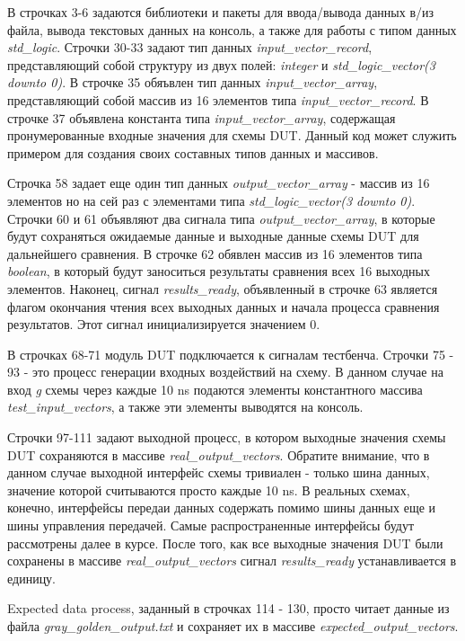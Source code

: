 В строчках 3-6 задаются библиотеки и пакеты для ввода/вывода данных в/из файла, вывода текстовых данных на консоль, а также для работы с типом данных \emph{std\_logic}. Строчки 30-33 задают  тип данных \emph{input\_vector\_record}, представляющий собой структуру из двух полей: \emph{integer} и \emph{std\_logic\_vector(3 downto 0)}. В строчке 35 обяъвлен тип данных \emph{input\_vector\_array}, представляющий собой массив из 16 элементов типа \emph{input\_vector\_record}. В строчке 37 объявлена константа типа \emph{input\_vector\_array}, содержащая пронумерованные входные значения для схемы DUT. Данный код может служить примером для создания своих составных типов данных и массивов.  

Строчка 58 задает еще один тип данных \emph{output\_vector\_array} - массив из 16 элементов но на сей раз с элементами типа \emph{std\_logic\_vector(3 downto 0)}. Строчки 60 и 61 объявляют два сигнала типа \emph{output\_vector\_array}, в которые будут сохраняться ожидаемые данные и выходные данные схемы DUT для дальнейшего сравнения. В строчке 62 обявлен массив из 16 элементов типа \emph{boolean}, в который будут заноситься результаты сравнения всех 16 выходных элементов. Наконец, сигнал \emph{results\_ready}, объявленный в строчке 63 является флагом окончания чтения всех выходных данных и начала процесса сравнения результатов. Этот сигнал инициализируется значением 0. 

В строчках 68-71 модуль DUT подключается к сигналам тестбенча. Строчки 75 - 93 - это процесс генерации входных воздействий на схему. В данном случае на вход \emph{g} схемы через каждые 10 ns подаются элементы константного массива \emph{test\_input\_vectors}, а также эти элементы выводятся на консоль. 

Строчки 97-111 задают выходной процесс, в котором выходные значения схемы DUT сохраняются в массиве \emph{real\_output\_vectors}. Обратите внимание, что в данном случае выходной интерфейс схемы тривиален - только шина данных, значение которой считываются просто каждые 10 ns. В реальных схемах, конечно, интерфейсы передаи данных содержать помимо шины данных еще и шины управления передачей. Самые распространенные интерфейсы будут рассмотрены далее в курсе. После того, как все выходные значения DUT были сохранены в массиве \emph{real\_output\_vectors} сигнал \emph{results\_ready} устанавливается в единицу. 

Expected data process, заданный в строчках 114 - 130, просто читает данные из файла \emph{gray\_golden\_output.txt} и сохраняет их в массиве \emph{expected\_output\_vectors}. 

